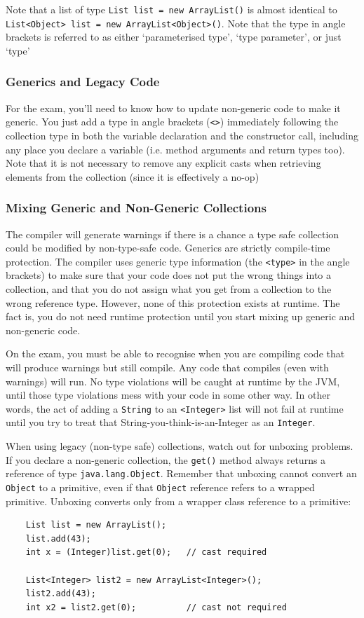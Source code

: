 Note that a list of type \verb#List list = new ArrayList()# is almost identical 
to \verb#List<Object> list = new ArrayList<Object>()#. Note that the type in 
angle brackets is referred to as either `parameterised type', `type parameter', 
or just `type'

\subsubsection{Generics and Legacy Code}
For the exam, you'll need to know how to update non-generic code to make it 
generic. You just add a type in angle brackets (\verb#<>#) immediately 
following the collection type in both the variable declaration and the 
constructor call, including any place you declare a variable (i.e. method 
arguments and return types too). Note that it is not necessary to remove any 
explicit casts when retrieving elements from the collection (since it is 
effectively a no-op) 

\subsubsection{Mixing Generic and Non-Generic Collections}
The compiler will generate warnings if there is a chance a type safe collection 
could be modified by non-type-safe code. Generics are strictly compile-time 
protection. The compiler uses generic type information (the \verb#<type># in 
the angle brackets) to make sure that your code does not put the wrong things 
into a collection, and that you do not assign what you get from a collection to 
the wrong reference type. However, none of this protection exists at runtime.  
The fact is, you do not need runtime protection until you start mixing up 
generic and non-generic code.

On the exam, you must be able to recognise when you are compiling code that 
will produce warnings but still compile. Any code that compiles (even with 
warnings) will run. No type violations will be caught at runtime by the JVM, 
until those type violations mess with your code in some other way. In other 
words, the act of adding a \verb#String# to an \verb#<Integer># list will not 
fail at runtime until you try to treat that String-you-think-is-an-Integer as 
an \verb#Integer#.

When using legacy (non-type safe) collections, watch out for unboxing problems.  
If you declare a non-generic collection, the \verb#get()# method always returns 
a reference of type \verb#java.lang.Object#. Remember that unboxing cannot 
convert an \verb#Object# to a primitive, even if that \verb#Object# reference 
refers to a wrapped primitive. Unboxing converts only from a wrapper class 
reference to a primitive:
\begin{verbatim}
    List list = new ArrayList();
    list.add(43);
    int x = (Integer)list.get(0);   // cast required

    List<Integer> list2 = new ArrayList<Integer>();
    list2.add(43);
    int x2 = list2.get(0);          // cast not required
\end{verbatim}

